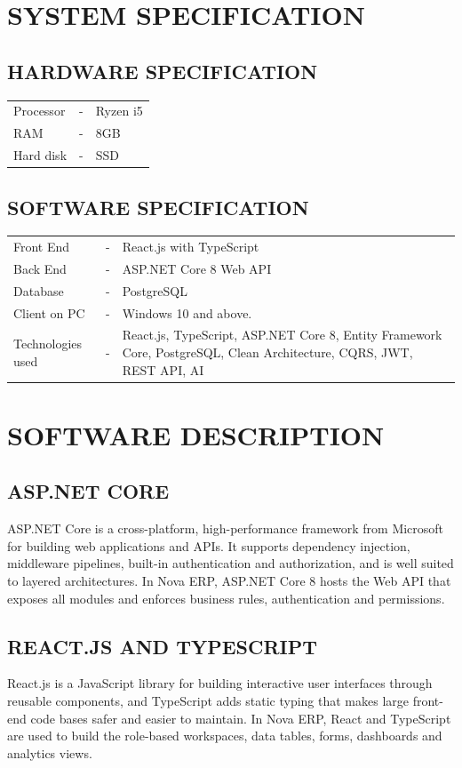 \documentclass[12pt,a4paper]{report}
\begin{document}
\section{SYSTEM SPECIFICATION}
\subsection{HARDWARE SPECIFICATION}
\begin{tabular}{@{}p{3.6cm}p{0.5cm}p{8cm}@{}}
Processor & - & Ryzen i5\\
RAM & - & 8GB\\
Hard disk & - & SSD\\
\end{tabular}

\subsection{SOFTWARE SPECIFICATION}
\begin{tabular}{@{}p{3.6cm}p{0.5cm}p{10cm}@{}}
Front End & - & React.js with TypeScript\\
Back End & - & ASP.NET Core 8 Web API\\
Database & - & PostgreSQL\\
Client on PC & - & Windows 10 and above.\\
Technologies used & - & React.js, TypeScript, ASP.NET Core 8, Entity Framework Core, PostgreSQL, Clean Architecture, CQRS, JWT, REST API, AI\\
\end{tabular}

\section{SOFTWARE DESCRIPTION}
\subsection{ASP.NET CORE}
ASP.NET Core is a cross-platform, high-performance framework from Microsoft for building web applications and APIs. It supports dependency injection, middleware pipelines, built-in authentication and authorization, and is well suited to layered architectures. In Nova ERP, ASP.NET Core 8 hosts the Web API that exposes all modules and enforces business rules, authentication and permissions.

\subsection{REACT.JS AND TYPESCRIPT}
React.js is a JavaScript library for building interactive user interfaces through reusable components, and TypeScript adds static typing that makes large front-end code bases safer and easier to maintain. In Nova ERP, React and TypeScript are used to build the role-based workspaces, data tables, forms, dashboards and analytics views.
\end{document}
